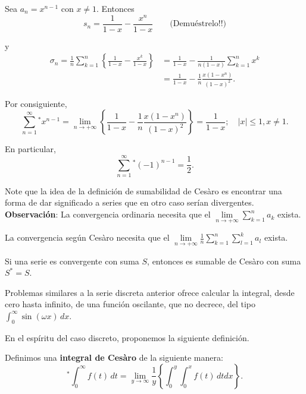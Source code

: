 \begin{ejemplo}
Sea $a_n = x^{n-1}$ con $x \neq 1$. Entonces
$$s_n = \frac{1}{1-x} - \frac{x^n}{1-x} \qquad \mbox{(Demuéstrelo!!)}$$

y
\begin{align*}
 \sigma_n = \frac{1}{n} \sum_{k=1}^n \left\{\frac{1}{1-x} - \frac{x^k}{1-x} \right\} &= \frac{1}{1-x} - \frac{1}{n(1-x)} \sum_{k =1}^{n} x^k   \\
 &=\frac{1}{1-x} -  \frac{1}{n} \frac{x(1-x^n)}{(1-x)^2}.
\end{align*}

Por consiguiente, 
$$\sum_{n=1}^{\infty}^* x^{n-1} = \lim_{n \to +\infty} \left\{ \frac{1}{1-x} -  \frac{1}{n} \frac{x(1-x^n)}{(1-x)^2}\right\} = \frac{1}{1-x}; \quad |x| \leq 1, x \neq 1. $$

En particular,
$$\sum_{n=1}^{\infty}^* (-1)^{n-1} = \frac{1}{2}.$$

\end{ejemplo}

Note que la idea de la definición de sumabilidad de Cesàro es encontrar una forma de dar significado a series que en otro caso serían divergentes.
\\

\textbf{Observación}: La convergencia ordinaria necesita que el $\lim\limits_{n \to + \infty} \sum\limits_{k = 1}^n a_{k}$ exista. 

\hspace{2.45cm} La convergencia según Cesàro necesita que el $\lim\limits_{n \to + \infty} \frac{1}{n} \sum\limits_{k = 1}^n  \sum\limits_{l = 1}^{k} a_{l}$ exista.

\begin{teorema}
Si una serie es convergente con suma $S$, entonces es sumable de Cesàro con suma $S^* = S$.
\end{teorema}

Problemas similares a la serie discreta anterior ofrece calcular la integral, desde cero hasta infinito, de una función oscilante, que no decrece, del tipo $\int_0^{\infty} \sin(\omega x) \,dx$.

En el espíritu del caso discreto, proponemos la siguiente definición.

\begin{defi}
Definimos una \textbf{integral de Cesàro} de la siguiente manera:
\begin{equation}
    ^* \int_0^{\infty} f(t) \,dt = \lim_{y \to \infty } \frac{1}{y} \left\{ \int_0^y \int_0^x f(t) \,dt dx \right\}. \label{IntegralCesaro1}
\end{equation}

\end{defi}


